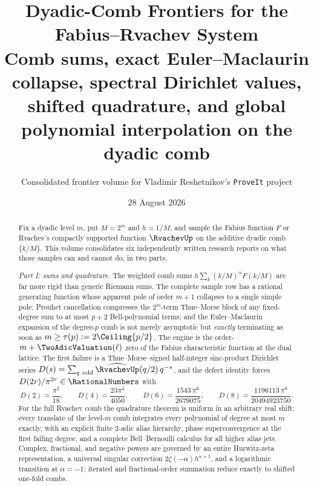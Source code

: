 \documentclass[11pt,oneside]{article}
\title{\bfseries Dyadic-Comb Frontiers for the Fabius--Rvachev System\\[0.4em]
\large Comb sums, exact Euler--Maclaurin collapse, spectral Dirichlet values,\\
shifted quadrature, and global polynomial interpolation on the dyadic comb}
\author{Consolidated frontier volume for Vladimir Reshetnikov's \texttt{ProveIt} project}
\date{28 August 2026}
\numberwithin{equation}{section}
\theoremstyle{definition}
\theoremstyle{remark}
\begin{document}
\maketitle

\begin{abstract}
\noindent
Fix a dyadic level $m$, put $M=2^m$ and $h=1/M$, and sample the Fabius
function $F$ or Rvachev's compactly supported function $\RvachevUp$ on the
additive dyadic comb $\{k/M\}$.  This volume consolidates six
independently written research reports on what those samples can and
cannot do, in two parts.

\emph{Part I: sums and quadrature.}  The weighted comb sums
$h\sum_k(k/M)^{\alpha}F(k/M)$ are far more rigid than generic Riemann
sums.  The complete sample row has a rational generating function whose
apparent pole of order $m+1$ collapses to a single simple pole; Prouhet
cancellation compresses the $2^m$-term Thue--Morse block of any
fixed-degree sum to at most $p+2$ Bell-polynomial terms; and the
Euler--Maclaurin expansion of the degree-$p$ comb is not merely
asymptotic but \emph{exactly} terminating as soon as
$m\ge\tau(p):=2\Ceiling{p/2}$.  The engine is the order-$m+\TwoAdicValuation(\ell)$
zero of the Fabius characteristic function at the dual lattice.  The
first failure is a Thue--Morse--signed half-integer sinc-product
Dirichlet series
$D(s)=\sum_{q\ \mathrm{odd}}\widehat{\RvachevUp}(q/2)\,q^{-s}$, and the defect
identity forces $D(2r)/\pi^{2r}\in\RationalNumbers$ with
\[
 D(2)=\frac{\pi^2}{18},\qquad
 D(4)=\frac{23\pi^4}{4050},\qquad
 D(6)=\frac{1543\,\pi^6}{2679075},\qquad
 D(8)=\frac{1196113\,\pi^8}{20494923750}.
\]
For the full Rvachev comb the quadrature theorem is uniform in an
arbitrary real shift: every translate of the level-$m$ comb integrates
every polynomial of degree at most $m$ exactly, with an explicit
finite $2$-adic alias hierarchy, phase superconvergence at the first
failing degree, and a complete Bell--Bernoulli calculus for all higher
alias jets.  Complex, fractional, and negative powers are governed by an
entire Hurwitz-zeta representation, a universal singular correction
$2\zeta(-\alpha)h^{\alpha+1}$, and a logarithmic transition at
$\alpha=-1$; iterated and fractional-order summation reduce exactly to
shifted one-fold combs.


\end{abstract}
\end{document}
